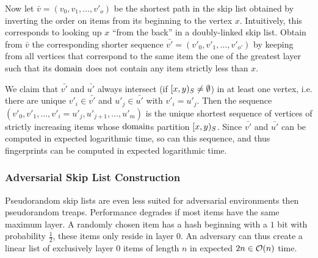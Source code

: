 Now let $\bar{v} = (v_0, v_1, \ldots, v'_o)$ be the shortest path in the skip list obtained by inverting the order on items from its beginning to the vertex $x$. Intuitively, this corresponds to looking up $x$ ``from the back'' in a doubly-linked skip list. Obtain from $\bar{v}$ the corresponding shorter sequence $\bar{v'} = (v'_0, v'_1, \ldots, v'_{o'})$ by keeping from all vertices that correspond to the same item the one of the greatest layer such that its $\operatorname{domain}$ does not contain any item strictly less than $x$.

We claim that $\bar{v'}$ and $\bar{u'}$ always intersect (if $[{x},{y})_{S} \neq \emptyset$) in at least one vertex, i.e. there are unique $v'_i \in \bar{v'}$ and $u'_j \in \bar{u'}$ with $v'_i = u'_j$. Then the sequence $(v'_0, v'_1, \ldots, v'_i = u'_j, u'_{j + 1}, \ldots, u'_{m})$ is the unique shortest sequence of vertices of strictly increasing items whose $\operatorname{domain}$s partition $[{x},{y})_{S}$. Since $\bar{v'}$ and $\bar{u'}$ can be computed in expected logarithmic time, so can this sequence, and thus fingerprints can be computed in expected logarithmic time.

\subsubsection{Adversarial Skip List Construction}

Pseudorandom skip lists are even less suited for adversarial environments then pseudorandom treaps. Performance degrades if most items have the same maximum layer. A randomly chosen item has a hash beginning with a $1$ bit with probability $\frac{1}{2}$, these items only reside in layer $0$. An adversary can thus create a linear list of exclusively layer $0$ items of length $n$ in expected $2n \in \mathcal{O}(n)$ time.
